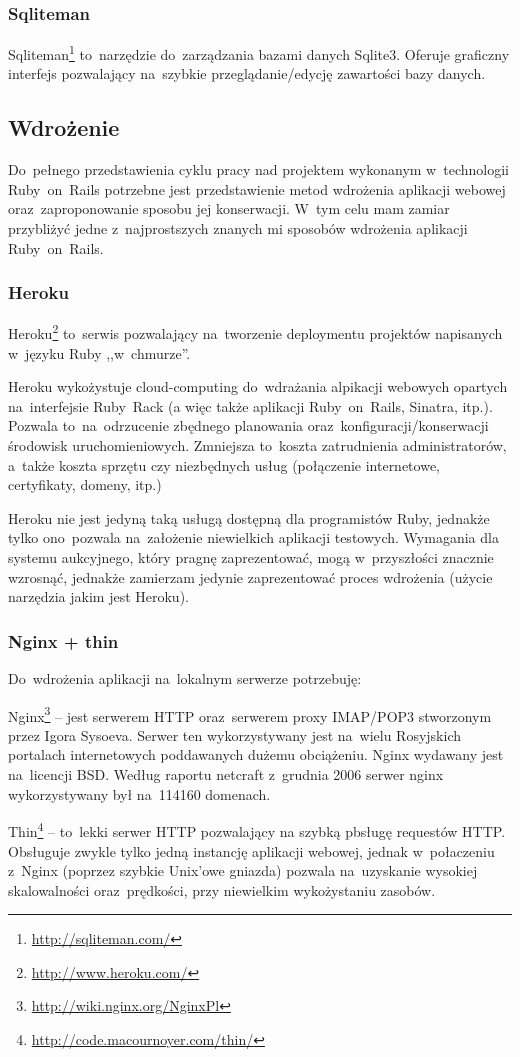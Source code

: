 \subsubsection{Sqliteman}

Sqliteman\footnote{\url{http://sqliteman.com/}} to~narzędzie do~zarządzania bazami danych Sqlite3. Oferuje graficzny interfejs pozwalający na~szybkie przeglądanie/edycję zawartości bazy danych.

\subsection{Wdrożenie}

Do~pełnego przedstawienia cyklu pracy nad projektem wykonanym w~technologii Ruby~on~Rails potrzebne jest przedstawienie metod wdrożenia aplikacji webowej oraz~zaproponowanie sposobu jej konserwacji. W~tym celu mam zamiar przybliżyć jedne z~najprostszych znanych mi sposobów wdrożenia aplikacji Ruby~on~Rails.

\subsubsection{Heroku}

Heroku\footnote{\url{http://www.heroku.com/}} to~serwis pozwalający na~tworzenie deploymentu projektów napisanych w~języku Ruby ,,w~chmurze''.


Heroku wykożystuje cloud-computing do~wdrażania alpikacji webowych opartych na~interfejsie Ruby~Rack (a więc także aplikacji Ruby~on~Rails, Sinatra, itp.). Pozwala to~na~odrzucenie zbędnego planowania oraz~konfiguracji/konserwacji środowisk uruchomieniowych. Zmniejsza to~koszta zatrudnienia administratorów, a~także koszta sprzętu czy niezbędnych usług (połączenie internetowe, certyfikaty, domeny, itp.)


Heroku nie jest jedyną taką usługą dostępną dla programistów Ruby, jednakże tylko ono~pozwala na~założenie niewielkich aplikacji testowych. Wymagania dla systemu aukcyjnego, który pragnę zaprezentować, mogą w~przyszłości znacznie wzrosnąć, jednakże zamierzam jedynie zaprezentować proces wdrożenia (użycie narzędzia jakim jest Heroku).

\subsubsection{Nginx + thin}

Do~wdrożenia aplikacji na~lokalnym serwerze potrzebuję:


Nginx\footnote{\url{http://wiki.nginx.org/NginxPl}} -- jest serwerem HTTP oraz~serwerem proxy IMAP/POP3 stworzonym przez Igora Sysoeva. Serwer ten wykorzystywany jest na~wielu Rosyjskich portalach internetowych poddawanych dużemu obciążeniu. Nginx wydawany jest na~licencji BSD. Według raportu netcraft z~grudnia 2006 serwer nginx wykorzystywany był na~114160 domenach.


Thin\footnote{\url{http://code.macournoyer.com/thin/}} -- to~lekki serwer HTTP pozwalający na szybką pbsługę requestów HTTP. Obsługuje zwykle tylko jedną instancję aplikacji webowej, jednak w~połaczeniu z~Nginx (poprzez szybkie Unix'owe gniazda) pozwala na~uzyskanie wysokiej skalowalności oraz~prędkości, przy niewielkim wykożystaniu zasobów.
